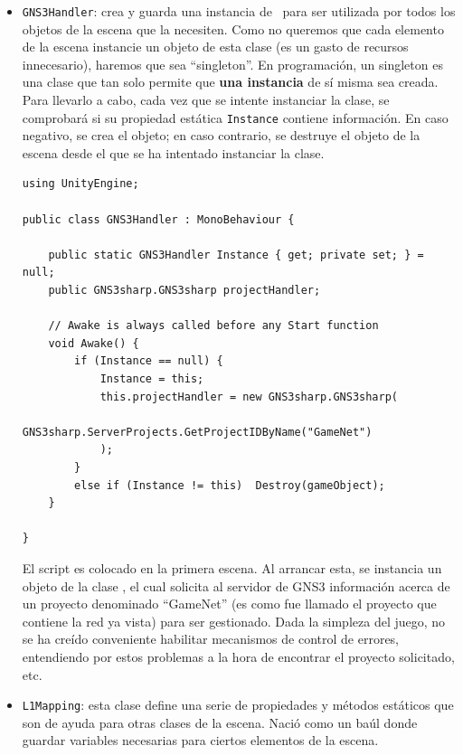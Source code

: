 \begin{itemize}
\item \texttt{GNS3Handler}: crea y guarda una instancia de \GNSCS~para ser utilizada por todos los objetos de la escena que la necesiten. Como no queremos que cada elemento de la escena instancie un objeto de esta clase (es un gasto de recursos innecesario), haremos que sea ``singleton''. En programación, un singleton es una clase que tan solo permite que \textbf{una instancia} de sí misma sea creada\cite{csindepth}. Para llevarlo a cabo, cada vez que se intente instanciar la clase, se comprobará si su propiedad estática \texttt{Instance} contiene información. En caso negativo, se crea el objeto; en caso contrario, se destruye el objeto de la escena desde el que se ha intentado instanciar la clase.

\begin{lstlisting}[language={[Sharp]C}, caption={\texttt{GNS3Handler}}, label={GNS3Handler_code}]
using UnityEngine;

public class GNS3Handler : MonoBehaviour {

    public static GNS3Handler Instance { get; private set; } = null;
    public GNS3sharp.GNS3sharp projectHandler;

    // Awake is always called before any Start function
    void Awake() {
        if (Instance == null) {
            Instance = this;
            this.projectHandler = new GNS3sharp.GNS3sharp(
                GNS3sharp.ServerProjects.GetProjectIDByName("GameNet")
            );
        }
        else if (Instance != this)  Destroy(gameObject);
    }

}
\end{lstlisting}

El script es colocado en la primera escena. Al arrancar esta, se instancia un objeto de la clase \GNSCS, el cual solicita al servidor de GNS3 información acerca de un proyecto denominado ``GameNet'' (es como fue llamado el proyecto que contiene la red ya vista) para ser gestionado. Dada la simpleza del juego, no se ha creído conveniente habilitar mecanismos de control de errores, entendiendo por estos problemas a la hora de encontrar el proyecto solicitado, etc.

\item \texttt{L1Mapping}: esta clase define una serie de propiedades y métodos estáticos que son de ayuda para otras clases de la escena. Nació como un baúl donde guardar variables necesarias para ciertos elementos de la escena.


\end{itemize}
